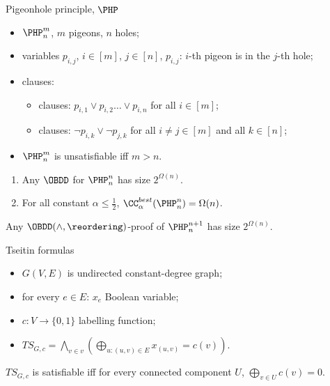 \begin{frame}{Pigeonhole principle, $\PHP$}
	\begin{itemize}
        \item $\PHP^m_n$, $m$ pigeons, $n$ holes;
        \item variables $p_{i, j}$, $i \in [m]$, $j \in [n]$, $p_{i, j}$: $i$-th pigeon is in the $j$-th
            hole;
        \item clauses:
        	\begin{itemize}
                \item \color{blue}{long} clauses:
                    $p_{i, 1} \lor p_{i, 2} \dots \lor p_{i, n}$ for all $i \in [m]$;
                \item \color{blue}{short} clauses: $\lnot p_{i, k} \lor \lnot p_{j, k}$ for all $i \neq j
                    \in [m]$ and all $k \in [n]$;
            \end{itemize}
        \item $\PHP^m_n$ is unsatisfiable iff $m > n$.
    \end{itemize}

    \pause
    \begin{lemma}
        \begin{enumerate}
            \item Any $\OBDD$ for $\PHP^n_n$ has size $2^{\Omega(n)}$.
            \item For all constant $\alpha \le \frac{1}{2}$, $\CC^{best}_{\alpha}(\PHP^n_n) = \Omega(n)$.
        \end{enumerate}
    \end{lemma}

    \pause

    \begin{theorem}
        Any $\OBDD(\land, \reordering)$-proof of $\PHP^{n+1}_n$ has size $2^{\Omega(n)}$.
    \end{theorem}

\end{frame}


\begin{frame}{Tseitin formulas}
	\begin{itemize}
        \item $G(V, E)$ is undirected constant-degree graph;
        \item for every $e \in E$: $x_e$ Boolean variable;
        \item $c: V \to \{0, 1\}$ labelling function;
        \item $TS_{G, c} = \bigwedge\limits_{v \in v} \left( \bigoplus\limits_{u: (u, v) \in E}
            x_{(u, v)} = c(v) \right)$.
    \end{itemize}

    \begin{Lemma}
        $TS_{G, c}$ is satisfiable iff for every connected component $U$, $\bigoplus\limits_{v \in U}
        c(v) = 0$.
    \end{Lemma}
\end{frame}


